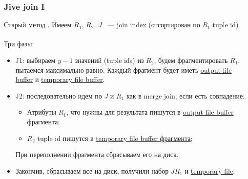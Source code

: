 \documentclass{beamer}
\begin{document}
\begin{frame}
\frametitle{Jive join I}

Старый метод \cite{Li1999}. Имеем $R_1$, $R_2$, $J$ ~--- join index (отсортирован по $R_1$ tuple id)\\~\\

Три фазы:
\begin{itemize}
  \item J1: выбираем $y-1$ значений (tuple ids) из $R_2$, будем фрагментировать $R_1$, пытаемся максимально равно. Каждый фрагмент будет иметь \underline{output file buffer} и \underline{temporary file buffer}.
  \item J2: последовательно идем по $J$ и $R_1$ как в merge join; если есть совпадение:
  \begin{itemize}
    \item Атрибуты $R_1$, что нужны для результата пишутся в \underline{output file buffer} фрагмента;
    \item $R_2$ tuple id пишутся в \underline{temporary file buffer фрагмента};
  \end{itemize}
  При переполнении фрагмента сбрасываем его на диск.
  \item Закончив, сбрасываем все на диск, получили набор $JR_1$ и \underline{temporary file};
  
\end{itemize}


\end{frame}
\end{document}
